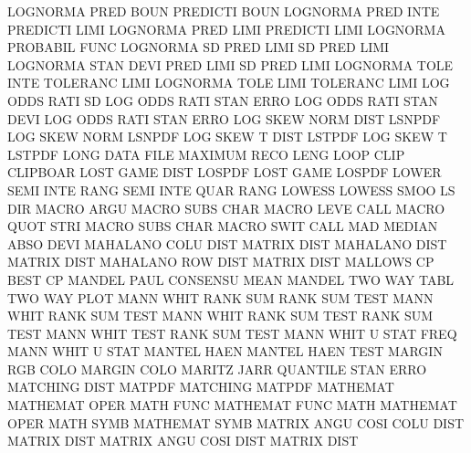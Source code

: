 LOGNORMA PRED BOUN                      PREDICTI BOUN
LOGNORMA PRED INTE                      PREDICTI LIMI
LOGNORMA PRED LIMI                      PREDICTI LIMI
LOGNORMA                                PROBABIL FUNC
LOGNORMA SD   PRED LIMI                 SD       PRED LIMI
LOGNORMA STAN DEVI PRED LIMI            SD       PRED LIMI
LOGNORMA TOLE INTE                      TOLERANC LIMI
LOGNORMA TOLE LIMI                      TOLERANC LIMI
LOG      ODDS RATI SD                   LOG      ODDS RATI STAN ERRO
LOG      ODDS RATI STAN DEVI            LOG      ODDS RATI STAN ERRO
LOG      SKEW NORM DIST                 LSNPDF
LOG      SKEW NORM                      LSNPDF
LOG      SKEW T    DIST                 LSTPDF
LOG      SKEW T                         LSTPDF
LONG     DATA FILE                      MAXIMUM  RECO LENG
LOOP     CLIP                           CLIPBOAR
LOST     GAME DIST                      LOSPDF
LOST     GAME                           LOSPDF
LOWER    SEMI INTE RANG                 SEMI     INTE QUAR RANG
LOWESS                                  LOWESS   SMOO
LS                                      DIR
MACRO    ARGU                           MACRO    SUBS CHAR
MACRO    LEVE                           CALL
MACRO    QUOT STRI                      MACRO    SUBS CHAR
MACRO    SWIT                           CALL
MAD                                     MEDIAN   ABSO DEVI
MAHALANO COLU DIST                      MATRIX   DIST
MAHALANO DIST                           MATRIX   DIST
MAHALANO ROW  DIST                      MATRIX   DIST
MALLOWS  CP                             BEST     CP
MANDEL   PAUL                           CONSENSU MEAN
MANDEL   TWO  WAY  TABL                 TWO      WAY  PLOT
MANN     WHIT RANK SUM                  RANK     SUM  TEST
MANN     WHIT                           RANK     SUM  TEST
MANN     WHIT RANK SUM  TEST            RANK     SUM  TEST
MANN     WHIT TEST                      RANK     SUM  TEST
MANN     WHIT U    STAT FREQ            MANN     WHIT U    STAT
MANTEL   HAEN                           MANTEL   HAEN TEST
MARGIN   RGB  COLO                      MARGIN   COLO
MARITZ   JARR                           QUANTILE STAN ERRO
MATCHING DIST                           MATPDF
MATCHING                                MATPDF
MATHEMAT                                MATHEMAT OPER
MATH     FUNC                           MATHEMAT FUNC
MATH                                    MATHEMAT OPER
MATH     SYMB                           MATHEMAT SYMB
MATRIX   ANGU COSI COLU DIST            MATRIX   DIST
MATRIX   ANGU COSI DIST                 MATRIX   DIST
